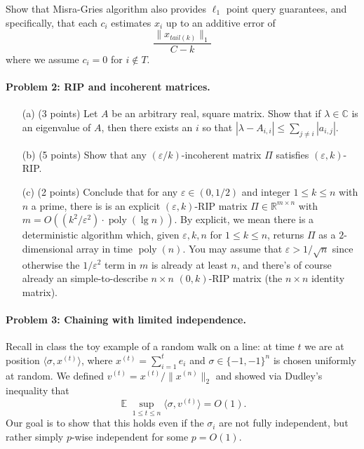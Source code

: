 \documentclass[12pt]{article}
\newcommand{\eps}{\varepsilon}
\newcommand{\R}{\mathbb{R}}
\newcommand{\inprod}[1]{\langle #1 \rangle}
\DeclareMathOperator*{\E}{\mathbb{E}}
\begin{document}
Show that Misra-Gries algorithm also provides $\ell_1$ point query guarantees, and specifically, that each $c_i$ estimates $x_i$ up to an additive error of
\[ \frac{\|x_{tail(k)}\|_1}{C-k} \]
where we assume $c_i=0$ for $i \notin T$.

\paragraph{Problem 2: RIP and incoherent matrices.} 
\begin{itemize}
\item[(a)] (3 points) Let $A$ be an arbitrary real, square matrix. Show that if $\lambda\in\mathbb C$ is an eigenvalue of $A$, then there exists an $i$ so that $|\lambda - A_{i,i}| \le \sum_{j\neq i} |a_{i,j}|$.
\item[(b)] (5 points) Show that any $(\eps/k)$-incoherent matrix $\Pi$ satisfies $(\eps, k)$-RIP.
\item[(c)] (2 points) Conclude that for any $\eps\in(0, 1/2)$ and integer $1 \le k \le n$ with $n$ a prime, there is is an explicit $(\eps,k)$-RIP matrix $\Pi\in\R^{m\times n}$ with $m = O((k^2/\eps^2) \cdot \mathop{poly}(\lg n))$. By explicit, we mean there is a deterministic algorithm which, given $\eps,k,n$ for $1\le k\le n$, returns $\Pi$ as a $2$-dimensional array in time $\mathop{poly}(n)$. You may assume that $\eps>1/\sqrt n$ since otherwise the $1/\eps^2$ term in $m$ is already at least $n$, and there's of course already an simple-to-describe $n\times n$ $(0,k)$-RIP matrix (the $n\times n$ identity matrix).
\end{itemize}

\paragraph{Problem 3: Chaining with limited independence.} Recall in class the toy example of a random walk on a line: at time $t$ we are at position $\inprod{\sigma, x^{(t)}}$, where $x^{(t)} = \sum_{i=1}^t e_i$ and $\sigma\in\{-1,-1\}^n$ is chosen uniformly at random. We defined $v^{(t)} = x^{(t)}/\|x^{(n)}\|_2$ and showed via Dudley's inequality that
\begin{equation}
\E \sup_{1\le t\le n} \inprod{\sigma, v^{(t)}} = O(1) . \label{eqn:walk}
\end{equation}
Our goal is to show that this holds even if the $\sigma_i$ are not fully independent, but rather simply $p$-wise independent for some $p = O(1)$.
\end{document}
